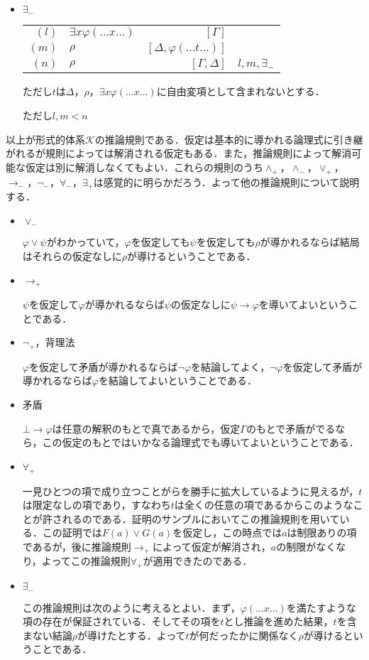 \documentclass[10pt,b5paper,papersize,dvipdfmx]{jsbook}
\begin{document}
\begin{itemize}
\begin{itemize}
\item $\exists_-$
\begin{table}[H]
\begin{center}
\begin{tabular}{rlrl}
$(l)$&$\exists x\varphi(\dots x \dots)$&$[\Gamma]$& \\
$(m)$&$\rho$&$[\Delta,\varphi(\dots t \dots)]$& \\
$(n)$&$\rho$&$[\Gamma,\Delta]$&$l,m,\exists_-$
\end{tabular}
\end{center}
\end{table}
ただし$t$は$\Delta$，$\rho$，$\exists x\varphi(\dots x \dots)$に自由変項として含まれないとする． \par
ただし$l,m<n$
\end{itemize}
\end{itemize}
以上が形式的体系$\mathcal K$の推論規則である．仮定は基本的に導かれる論理式に引き継がれるが規則によっては解消される仮定もある．また，推論規則によって解消可能な仮定は別に解消しなくてもよい．これらの規則のうち$\land_+$，$\land_-$，$\lor_+$，$\to_-$，$\lnot_-$，$\forall_-$，$\exists_+$は感覚的に明らかだろう．よって他の推論規則について説明する．
\begin{itemize}
\item $\lor_-$ \par
$\varphi \lor \psi$がわかっていて，$\varphi$を仮定しても$\psi$を仮定しても$\rho$が導かれるならば結局はそれらの仮定なしに$\rho$が導けるということである．
\item $\to_+$ \par
$\psi$を仮定して$\varphi$が導かれるならば$\psi$の仮定なしに$\psi \to \varphi$を導いてよいということである．
\item $\lnot_+$，背理法 \par
$\varphi$を仮定して矛盾が導かれるならば$\lnot \varphi$を結論してよく，$\lnot \varphi$を仮定して矛盾が導かれるならば$\varphi$を結論してよいということである．
\item 矛盾 \par
$\bot \to \varphi$は任意の解釈のもとで真であるから，仮定$\Gamma$のもとで矛盾がでるなら，この仮定のもとではいかなる論理式でも導いてよいということである．
\item $\forall_+$ \par
一見ひとつの項で成り立つことがらを勝手に拡大しているように見えるが，$t$は限定なしの項であり，すなわち$t$は全くの任意の項であるからこのようなことが許されるのである．証明のサンプルにおいてこの推論規則を用いている．この証明では$F(a)\lor G(a)$を仮定し，この時点では$a$は制限ありの項であるが，後に推論規則$\to_+$によって仮定が解消され，$a$の制限がなくなり，よってこの推論規則$\forall_+$が適用できたのである．
\item $\exists_-$ \par
この推論規則は次のように考えるとよい．まず，$\varphi(\dots x \dots)$を満たすような項の存在が保証されている．そしてその項を$t$とし推論を進めた結果，$t$を含まない結論$\rho$が導けたとする．よって$t$が何だったかに関係なく$\rho$が導けるということである．
\end{itemize}
\end{document}

